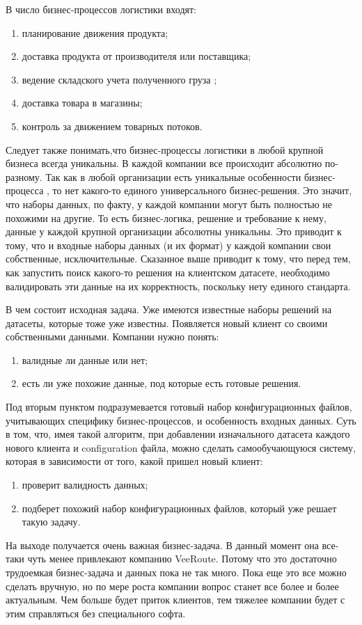 В число бизнес-процессов логистики входят:
\begin{enumerate}
\item планирование движения продукта;
\item доставка продукта от производителя или поставщика;
\item ведение складского учета полученного груза ;
\item доставка товара в магазины;
\item контроль за движением товарных потоков.
\end{enumerate}
Следует также понимать,что бизнес-процессы логистики в любой крупной бизнеса всегда уникальны.
В каждой компании все происходит абсолютно по-разному.
Так как в любой организации есть уникальные особенности бизнес-процесса , то нет какого-то единого универсального бизнес-решения.
Это значит, что наборы данных, по факту, у каждой компании могут быть полностью не похожими на другие.
То есть бизнес-логика, решение и требование к нему, данные у каждой крупной организации абсолютны уникальны.
Это приводит к тому, что и входные наборы данных (и их формат) у каждой компании свои собственные, исключительные.
Сказанное выше приводит к тому, что перед тем, как запустить поиск какого-то решения на клиентском датасете, необходимо валидировать эти данные на их корректность, поскольку нету единого стандарта.

В чем состоит исходная задача.
Уже имеются известные наборы решений на датасеты, которые тоже уже известны.
Появляется новый клиент со своими собственными данными.
Компании нужно понять:
\begin{enumerate}
	\item валидные ли данные или нет;
	\item есть ли уже похожие данные, под которые есть готовые решения.
\end{enumerate}
Под вторым пунктом подразумевается готовый набор конфигурационных файлов, учитывающих специфику бизнес-процессов, и особенность входных данных.
Суть в том, что, имея такой алгоритм, при добавлении изначального датасета каждого нового клиента  и configuration файла, можно сделать самообучающуюся систему, которая в зависимости от того, какой пришел новый клиент: 
\begin{enumerate}
	\item проверит валидность данных;
	\item подберет похожий набор конфигурационных файлов, который уже решает такую задачу.
\end{enumerate}
На выходе получается очень важная бизнес-задача.
В данный момент она все-таки чуть менее привлекают компанию VeeRoute.
Потому что это достаточно трудоемкая бизнес-задача и данных пока не так много.
Пока еще это все можно сделать вручную, но по мере роста компании вопрос станет все более и более актуальным.
Чем больше будет приток клиентов, тем тяжелее компании будет с этим справляться без специального софта.

